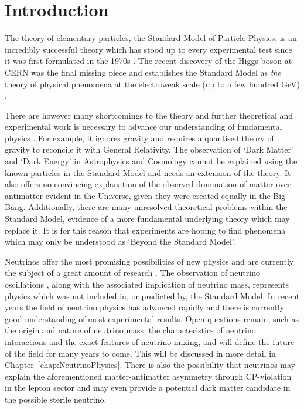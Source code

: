 
\graphicspath{{Introduction/Figs/}}

\chapter{Introduction}\label{chap:Introduction}

The theory of elementary particles, the Standard Model of Particle Physics, is an incredibly successful theory which has stood up to every experimental test since it was first formulated in the 1970s \cite{Glashow1961,Weinberg1967}.  The recent discovery of the Higgs boson at CERN \cite{Aad2012,Chatrchyan2012} was the final missing piece and establishes the Standard Model as \textit{the} theory of physical phenomena at the electroweak scale (up to a few hundred GeV) \cite{Shears2012,Bilenky2015}.

There are however many shortcomings to the theory and further theoretical and experimental work is necessary to advance our understanding of fundamental physics \cite{Ellis2012}.  For example, it ignores gravity and requires a quantised theory of gravity to reconcile it with General Relativity.  The observation of `Dark Matter' and `Dark Energy' in Astrophysics and Cosmology cannot be explained using the known particles in the Standard Model and needs an extension of the theory.  It also offers no convincing explanation of the observed domination of matter over antimatter evident in the Universe, given they were created equally in the Big Bang.  Additionally, there are many unresolved theoretical problems within the Standard Model, evidence of a more fundamental underlying theory which may replace it.  It is for this reason that experiments are hoping to find phenomena which may only be understood as `Beyond the Standard Model'.

Neutrinos offer the most promising possibilities of new physics and are currently the subject of a great amount of research \cite{Bilenky2015}.  The observation of neutrino oscillations \cite{SuperKamiokande1998,SNO2002}, along with the associated implication of neutrino mass, represents physics which was not included in, or predicted by, the Standard Model.  In recent years the field of neutrino physics has advanced rapidly and there is currently good understanding of most experimental results.  Open questions remain, such as the origin and nature of neutrino mass, the characteristics of neutrino interactions and the exact features of neutrino mixing, and will define the future of the field for many years to come.  This will be discussed in more detail in Chapter~\ref{chap:NeutrinoPhysics}.  There is also the possibility that neutrinos may explain the aforementioned matter-antimatter asymmetry through CP-violation in the lepton sector and may even provide a potential dark matter candidate in the possible sterile neutrino.

